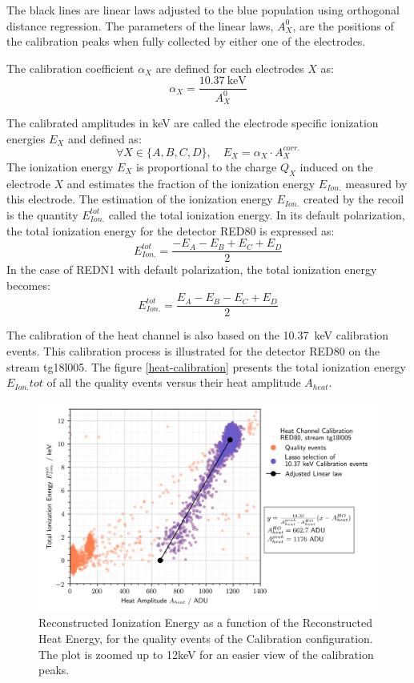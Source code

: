 The black lines are linear laws adjusted to the blue population using orthogonal distance regression. The parameters of the linear laws, $A_X^0$, are the positions of the calibration peaks when fully collected by either one of the electrodes. 

The calibration coefficient $\alpha_X$ are defined for each electrodes $X$ as:
\begin{equation}
\alpha_X = \frac{\SI{10.37}{\kilo\eV}}{A_X^0}
\end{equation}

The calibrated amplitudes in \si{\kilo\eV} are called the electrode specific ionization energies $E_X$ and defined as:
\begin{equation}
\forall X \in \{ A, B ,C,D \}, \quad 
E_X = \alpha_X \cdot A_X^{corr.}
\end{equation}
The ionization energy $E_X$ is proportional to the charge $Q_X$ induced on the electrode $X$ and estimates the fraction of the ionization energy $E_{Ion.}$ measured by this electrode. The estimation of the ionization energy $E_{Ion.}$ created by the recoil is the quantity $E_{Ion.}^{tot}$ called the total ionization energy. In its default polarization, the total ionization energy for the detector RED80 is expressed as:
\begin{equation}
E_{Ion.}^{tot} = \frac{-E_A -E_B + E_C + E_D}{2}
\end{equation}
In the case of REDN1 with default polarization, the total ionization energy becomes:
\begin{equation}
E_{Ion.}^{tot} = \frac{E_A - E_B - E_C + E_D}{2}
\end{equation}

The calibration of the heat channel is also based on the \SI{10.37}{\kilo\eV} calibration events. This calibration process is illustrated for the detector RED80 on the stream tg18l005. The figure \ref{heat-calibration} presents the total ionization energy $E_{Ion.}{tot}$ of all the quality events versus their heat amplitude $A_{heat}$.

\begin{figure}
\centering
\includegraphics[width=\linewidth,]{Figures/ElectrodesExperimental/heat_calibration.png}
\caption{Reconstructed Ionization Energy as a function of the Reconstructed Heat Energy, for the quality events of the Calibration configuration. The plot is zoomed up to 12keV for an easier view of the calibration peaks. }
\label{fig:heat-calibration}
\end{figure}

